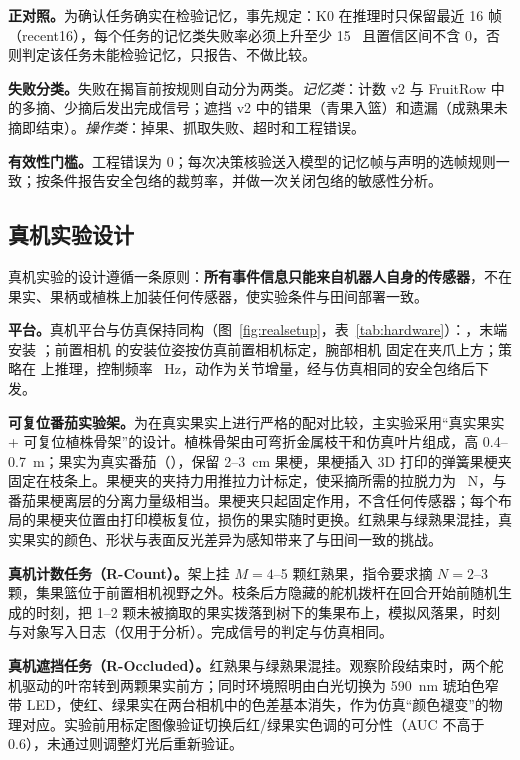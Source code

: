 \textbf{正对照。}为确认任务确实在检验记忆，事先规定：K0 在推理时只保留最近 16 帧（recent16），每个任务的记忆类失败率必须上升至少 15~\pp{} 且置信区间不含 0，否则判定该任务未能检验记忆，只报告、不做比较。

\textbf{失败分类。}失败在揭盲前按规则自动分为两类。\emph{记忆类}：计数 v2 与 FruitRow 中的多摘、少摘后发出完成信号；遮挡 v2 中的错果（青果入篮）和遗漏（成熟果未摘即结束）。\emph{操作类}：掉果、抓取失败、超时和工程错误。

\textbf{有效性门槛。}工程错误为 0；每次决策核验送入模型的记忆帧与声明的选帧规则一致；按条件报告安全包络的裁剪率，并做一次关闭包络的敏感性分析。

\subsection{真机实验设计}
\label{sec:real_design}

真机实验的设计遵循一条原则：\textbf{所有事件信息只能来自机器人自身的传感器}，不在果实、果柄或植株上加装任何传感器，使实验条件与田间部署一致。

\textbf{平台。}真机平台与仿真保持同构（图~\ref{fig:realsetup}，表~\ref{tab:hardware}）：，末端安装 ；前置相机  的安装位姿按仿真前置相机标定，腕部相机  固定在夹爪上方；策略在  上推理，控制频率 ~Hz，动作为关节增量，经与仿真相同的安全包络后下发。

\textbf{可复位番茄实验架。}为在真实果实上进行严格的配对比较，主实验采用“真实果实 + 可复位植株骨架”的设计。植株骨架由可弯折金属枝干和仿真叶片组成，高 0.4--0.7~m；果实为真实番茄（），保留 2--3~cm 果梗，果梗插入 3D 打印的弹簧果梗夹固定在枝条上。果梗夹的夹持力用推拉力计标定，使采摘所需的拉脱力为 ~N，与番茄果梗离层的分离力量级相当。果梗夹只起固定作用，不含任何传感器；每个布局的果梗夹位置由打印模板复位，损伤的果实随时更换。红熟果与绿熟果混挂，真实果实的颜色、形状与表面反光差异为感知带来了与田间一致的挑战。

\textbf{真机计数任务（R-Count）。}架上挂 $M=4$--5 颗红熟果，指令要求摘 $N=2$--3 颗，集果篮位于前置相机视野之外。枝条后方隐藏的舵机拨杆在回合开始前随机生成的时刻，把 1--2 颗未被摘取的果实拨落到树下的集果布上，模拟风落果，时刻与对象写入日志（仅用于分析）。完成信号的判定与仿真相同。

\textbf{真机遮挡任务（R-Occluded）。}红熟果与绿熟果混挂。观察阶段结束时，两个舵机驱动的叶帘转到两颗果实前方；同时环境照明由白光切换为 590~nm 琥珀色窄带 LED，使红、绿果实在两台相机中的色差基本消失，作为仿真“颜色褪变”的物理对应。实验前用标定图像验证切换后红/绿果实色调的可分性（AUC 不高于 0.6），未通过则调整灯光后重新验证。

